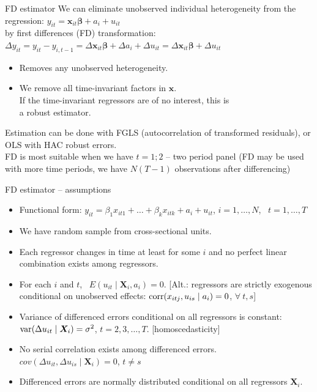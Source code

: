 \documentclass[usenames,dvipsnames]{beamer}
\begin{document}
\begin{frame}{FD estimator}
We can eliminate unobserved individual heterogeneity from the regression: \quad $y_{it} = \bm{x}_{it} \bm{\beta} + a_i + u_{it}$ \\ \smallskip
by first differences (FD) transformation: \\
$\Delta y_{it} = y_{it} - y_{i,t-1} = \Delta \bm{x}_{it} \bm{\beta} + \Delta a_i + \Delta u_{it} = \Delta \bm{x}_{it} \bm{\beta} + \Delta u_{it}$ \\ \medskip
\begin{itemize}
\item[$\checkmark$] Removes any unobserved heterogeneity.
\item[$\times$] We remove all time-invariant factors in $\bm{x}$.\\
If the time-invariant regressors are of no interest, this is \\a robust estimator.
\end{itemize} \medskip
Estimation can be done with FGLS (autocorrelation of transformed residuals), or OLS with HAC robust errors. \\
\medskip
FD is most suitable when we have $t = 1; 2$ – two period panel (FD may be used with more time periods, we have $N(T-1)$ observations after differencing)
\end{frame}
\begin{frame}{FD estimator – assumptions}
\begin{itemize}
\item[\textbf{FD.1}] Functional form: $y_{it} = \beta_1 x_{it1} + \dots + \beta_k x_{itk} + a_i + u_{it}$, $i = 1, \dots, N$, \ $t = 1, \dots, T$
\item[\textbf{FD.2}] We have random sample from cross-sectional units.
\item[\textbf{FD.3}] Each regressor changes in time at least for some $i$ and no perfect linear combination exists among regressors.
\item[\textbf{FD.4}] For each $i$ and $t$, \ $E (u_{it} \mid \bm{X}_i, a_i) = 0$. [Alt.: regressors are strictly exogenous conditional on unobserved effects: $\textnormal{corr}(x_{itj}, u_{is} \mid a_i)=0$, \quad $\forall \ t, s$]
\item[\textbf{FD.5}] Variance of differenced errors conditional on all regressors is constant: $\textnormal{var}(\Delta u_{it} \mid \bm{X}_i) = \sigma^2$, \quad $t= 2,3, \dots, T$. [homoscedasticity]
\item[\textbf{FD.6}] No serial correlation exists among differenced errors. $\textit{cov}(\Delta u_{it}, \Delta u_{is} \mid \bm{X}_i) = 0$, \quad $t \neq s$
\item[\textbf{FD.7}] Differenced errors are normally distributed conditional on all regressors $\bm{X}_i$.
\end{itemize}
\end{frame}
\end{document}

